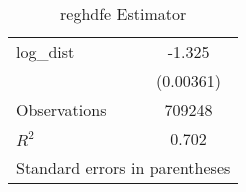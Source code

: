 \begin{table}[htbp]\centering
\caption{reghdfe Estimator}
\begin{tabular}{l*{1}{c}}
\hline\hline
\hline
log\_dist            &      -1.325\\
                    &   (0.00361)\\
\hline
Observations        &      709248\\
\(R^{2}\)           &       0.702\\
\hline\hline
\multicolumn{2}{l}{\footnotesize Standard errors in parentheses}\\
\end{tabular}
\end{table}

